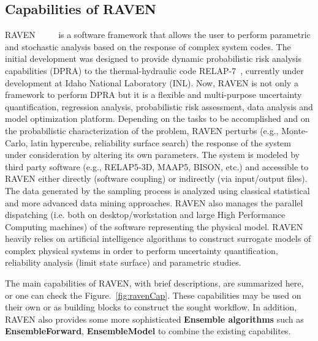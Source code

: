 \subsection{Capabilities of RAVEN}
RAVEN~\cite{alfonsiMC} ~\cite{alfonsiPSA}~\cite{RAVENFY13}~\cite{ESREL2014} is a software framework that allows the user to perform parametric and stochastic
analysis based on the response of complex system codes.
The initial development was designed to provide dynamic probabilistic risk analysis
capabilities (DPRA) to the thermal-hydraulic code RELAP-7~\cite{relap7FY12}, currently under development
at Idaho National Laboratory (INL).
Now, RAVEN is not only a framework to perform DPRA but it is a flexible and
multi-purpose uncertainty quantification, regression analysis, probabilistic risk assessment, data analysis and
model optimization platform. Depending on the tasks to be accomplished and on the probabilistic characterization
of the problem, RAVEN perturbs (e.g., Monte-Carlo, latin hypercube, reliability surface search) the response of
the system under consideration by altering its own parameters. The system is modeled by third party software
(e.g., RELAP5-3D, MAAP5, BISON, etc.) and accessible to RAVEN either directly (software coupling) or indirectly
(via input/output files). The data generated by the sampling process is analyzed using classical statistical
and more advanced data mining approaches. RAVEN also manages the parallel dispatching
(i.e. both on desktop/workstation and large High Performance Computing machines) of the software representing the
physical model. RAVEN heavily relies on artificial intelligence algorithms to construct surrogate models of
complex physical systems in order to perform uncertainty quantification, reliability analysis (limit state surface)
and parametric studies.

The main capabilities of RAVEN, with brief descriptions, are summarized here, or one can check the Figure.~\ref{fig:ravenCap}.
These capabilities may be used on their own or as building blocks to construct the sought workflow. In addition, RAVEN also provides some more sophisticated
\textbf{Ensemble algorithms} such as \textbf{EnsembleForward}, \textbf{EnsembleModel} to combine the existing
capabilites.


